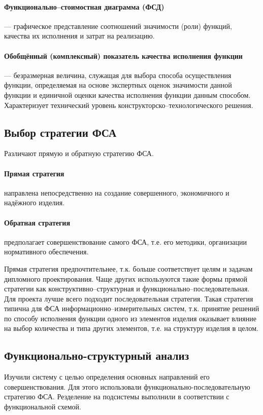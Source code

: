 \paragraph{Функционально--стоимостная диаграмма (ФСД)}
--- графическое представление соотношений значимости (роли) функций, качества их
исполнения и затрат на реализацию.

\paragraph{Обобщённый (комплексный) показатель качества исполнения функции}
--- безразмерная величина, служащая для выбора способа осуществления функции,
определяемая на основе экспертных оценок значимости данной функции и единичной
оценки качества исполнения функции данным способом.
Характеризует технический уровень конструкторско--технологического решения.

\subsection{Выбор стратегии ФСА}
Различают прямую и обратную стратегию ФСА.

\paragraph{Прямая стратегия}
направлена непосредственно на создание совершенного, экономичного и надёжного
изделия.

\paragraph{Обратная стратегия}
предполагает совершенствование самого ФСА, т.е. его методики, организации
нормативного обеспечения.

Прямая стратегия предпочтительнее, т.к. больше соответствует целям и задачам
дипломного проектирования.
Чаще других используются такие формы прямой стратегии как
конструктивно--структурная и функционально--последовательная.
Для проекта лучше всего подходит последовательная стратегия.
Такая стратегия типична для ФСА информационно--измерительных систем, т.к.
принятие решений по способу исполнения функции одного из элементов изделия
оказывает влияние на выбор количества и типа других элементов, т.е. на структуру
изделия в целом.

\subsection{Функционально-структурный анализ}
Изучили систему с целью определения основных направлений его совершенствования.
Для этого использовали функционально-последовательную стратегию ФСА.
Резделение на подсистемы выполнили в соответствии с функциональной схемой.

